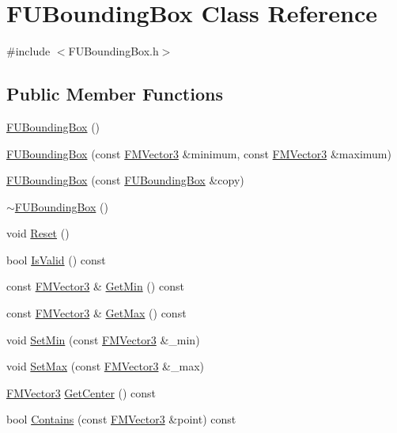\hypertarget{classFUBoundingBox}{
\section{FUBoundingBox Class Reference}
\label{classFUBoundingBox}
}


{\ttfamily \#include $<$FUBoundingBox.h$>$}

\subsection*{Public Member Functions}
\begin{DoxyCompactItemize}
\item 
\hyperlink{classFUBoundingBox_a157478de0b72cfbcd4427a144cfbc873}{FUBoundingBox} ()
\item 
\hyperlink{classFUBoundingBox_a3e100c46cd969849941192d0e8324322}{FUBoundingBox} (const \hyperlink{classFMVector3}{FMVector3} \&minimum, const \hyperlink{classFMVector3}{FMVector3} \&maximum)
\item 
\hyperlink{classFUBoundingBox_ac862b784a5a84556dc59ea1cbd0ffb22}{FUBoundingBox} (const \hyperlink{classFUBoundingBox}{FUBoundingBox} \&copy)
\item 
\hyperlink{classFUBoundingBox_a6e6e38f3765275619aa230ed70463b4f}{$\sim$FUBoundingBox} ()
\item 
void \hyperlink{classFUBoundingBox_ae50f545150575c8614357e742eb7472a}{Reset} ()
\item 
bool \hyperlink{classFUBoundingBox_a627e1be0327f83a299f6e87be82a0d5a}{IsValid} () const 
\item 
const \hyperlink{classFMVector3}{FMVector3} \& \hyperlink{classFUBoundingBox_a4092364ab7ec076ec5dbaa95f308baa3}{GetMin} () const 
\item 
const \hyperlink{classFMVector3}{FMVector3} \& \hyperlink{classFUBoundingBox_a03c5ede1bdda53d488a8c3478abe9594}{GetMax} () const 
\item 
void \hyperlink{classFUBoundingBox_a95e7936d3f2f5ee73107e47f3bc23af9}{SetMin} (const \hyperlink{classFMVector3}{FMVector3} \&\_\-min)
\item 
void \hyperlink{classFUBoundingBox_a07b2a93e37b1aaa4ba6aa8d8f7c8c898}{SetMax} (const \hyperlink{classFMVector3}{FMVector3} \&\_\-max)
\item 
\hyperlink{classFMVector3}{FMVector3} \hyperlink{classFUBoundingBox_a50ba12b293aac6ea938b230bb5820324}{GetCenter} () const 
\item 
bool \hyperlink{classFUBoundingBox_acf4c46b38be8d32c3a4b45e31f9a693c}{Contains} (const \hyperlink{classFMVector3}{FMVector3} \&point) const 

\end{DoxyCompactItemize}
